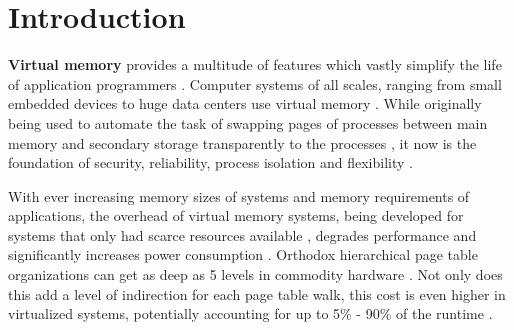 \chapter{Introduction} %


















\textbf{Virtual memory} provides a multitude of features which vastly simplify the life of application programmers \cite{jacob1998virtualissues}. Computer systems of all scales, ranging from small embedded devices to huge data centers use virtual memory \cite{bhattacharjee2017architectural}.
While originally being used to automate the task of swapping pages of processes between main memory and secondary storage transparently to the processes \cite{jacob1998virtualissues}, it now is the foundation of security, reliability, process isolation and flexibility \cite{wales1999virtual,jacobVirtualMemoryContemporary1998}.

With ever increasing memory sizes of systems and memory requirements of applications, the overhead of virtual memory systems, being developed for systems that only had scarce resources available \cite{halbuer2023morsels}, degrades performance and significantly increases power consumption \cite{zagieboylo2020cost}.
Orthodox hierarchical page table organizations \cite{tanenbaumOS} can get as deep as 5 levels in commodity hardware \cite{intel5LevelPaging5Level2017}. Not only does this add a level of indirection for each page table walk, this cost is even higher in virtualized systems, potentially accounting for up to 5\% - 90\% of the runtime \cite{yaniv2016hash}.

